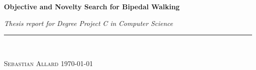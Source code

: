 
\vspace*{5cm}

\begin{flushleft}
\Huge \textsf{\textbf{Objective and Novelty Search for Bipedal Walking}}
\end{flushleft}

\emph{\large Thesis report for Degree Project C in Computer Science} \hfill \\
\rule{\textwidth}{1pt} \\

\begin{flushright}
\textsc{Sebastian Allard} \quad \today
\end{flushright}


\thispagestyle{empty}
